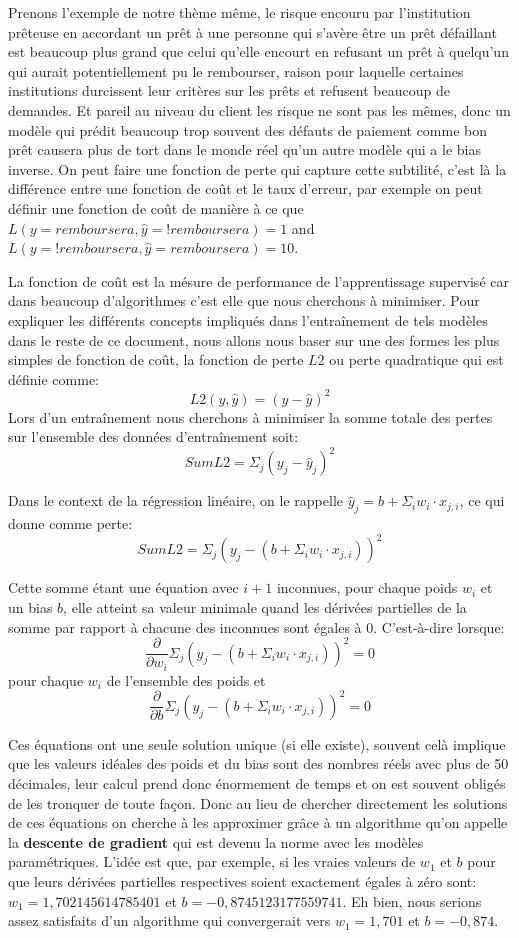 Prenons l'exemple de notre thème même, le risque encouru par l'institution prêteuse en accordant un prêt à une personne qui s'avère être un prêt défaillant est beaucoup plus grand que celui qu'elle encourt en refusant un prêt à quelqu'un qui aurait potentiellement pu le rembourser, raison pour laquelle certaines institutions durcissent leur critères sur les prêts et refusent beaucoup de demandes. Et pareil au niveau du client les risque ne sont pas les mêmes, donc un modèle qui prédit beaucoup trop souvent des défauts de paiement comme bon prêt causera plus de tort dans le monde réel qu'un autre modèle qui a le bias inverse. On peut faire une fonction de perte qui capture cette subtilité, c'est là la différence entre une fonction de coût et le taux d'erreur, par exemple on peut définir une fonction de coût de manière à ce que \(L(y=remboursera, \hat{y}=!remboursera)=1\) and \(L(y=!remboursera, \hat{y}=remboursera)=10\).

La fonction de coût est la mésure de performance de l'apprentissage supervisé car dans beaucoup d'algorithmes c'est elle que nous cherchons à minimiser. Pour expliquer les différents concepts impliqués dans l'entraînement de tels modèles dans le reste de ce document, nous allons nous baser sur une des formes les plus simples de fonction de coût, la fonction de perte \(L2\) ou perte quadratique qui est définie comme: \[L2(y, \hat{y}) = (y - \hat{y})^2\] Lors d'un entraînement nous cherchons à minimiser la somme totale des pertes sur l'ensemble des données d'entraînement soit: \[SumL2 = \Sigma_j (y_j - \hat{y}_j)^2\]

Dans le context de la régression linéaire, on le rappelle \(\hat{y}_j = b + \Sigma_i w_i \cdot x_{j,i}\), ce qui donne comme perte: \[SumL2 = \Sigma_j (y_j - (b + \Sigma_i w_i \cdot x_{j,i}))^2\]

Cette somme étant une équation avec \(i+1\) inconnues, pour chaque poids \(w_i\) et un bias \(b\), elle atteint sa valeur minimale quand les dérivées partielles de la somme par rapport à chacune des inconnues sont égales à 0. C'est-à-dire lorsque: \[\frac{\partial}{\partial w_i} \Sigma_j (y_j - (b + \Sigma_i w_i \cdot x_{j,i}))^2 = 0\] pour chaque \(w_i\) de l'ensemble des poids et \[\frac{\partial}{\partial b} \Sigma_j (y_j - (b + \Sigma_i w_i \cdot x_{j,i}))^2 = 0\]

Ces équations ont une seule solution unique (si elle existe), souvent celà implique que les valeurs idéales des poids et du bias sont des nombres réels avec plus de 50 décimales, leur calcul prend donc énormement de temps et on est souvent obligés de les tronquer de toute façon. Donc au lieu de chercher directement les solutions de ces équations on cherche à les approximer grâce à un algorithme qu'on appelle la \textbf{descente de gradient} qui est devenu la norme avec les modèles paramétriques. L'idée est que, par exemple, si les vraies valeurs de \(w_1\) et \(b\) pour que leurs dérivées partielles respectives soient exactement égales à zéro sont: $w_1 = 1,702145614785401$ et $b = -0,8745123177559741$. Eh bien, nous serions assez satisfaits d'un algorithme qui convergerait vers $w_1 = 1,701$ et $b = -0,874$.

